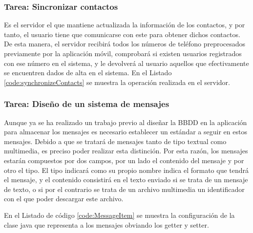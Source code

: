 


\subsubsection{Tarea: Sincronizar contactos}

Es el servidor el que mantiene actualizada la información de los contactos, y por tanto, el usuario tiene que comunicarse con este para obtener dichos contactos. De esta manera, el servidor recibirá todos los números de teléfono preprocesados previamente por la aplicación móvil, comprobará si existen usuarios registrados con ese número en el sistema, y le devolverá al usuario aquellos que efectivamente se encuentren dados de alta en el sistema. En el Listado \ref{code:synchronizeContacts} se muestra la operación realizada en el servidor.\\



\subsubsection{Tarea: Diseño de un sistema de mensajes}

Aunque ya se ha realizado un trabajo previo al diseñar la \ac{BBDD} en la aplicación para almacenar los mensajes es necesario establecer un estándar a seguir en estos mensajes. Debido a que se tratará de mensajes tanto de tipo textual como multimedia, es preciso poder realizar esta distinción. Por esta razón, los mensajes estarán compuestos por dos campos, por un lado el contenido del mensaje y por otro el tipo. El tipo indicará como su propio nombre indica el formato que tendrá el mensaje, y el contenido consistirá en el texto enviado si se trata de un mensaje de texto, o si por el contrario se trata de un archivo multimedia un identificador con el que poder descargar este archivo.

En el Listado de código \ref{code:MessageItem} se muestra la configuración de la clase java que representa a los mensajes obviando los getter y setter.\\



